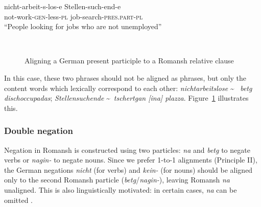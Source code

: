 \begin{exe}
   \ex\label{ex:stellensuchende} 
   \gll nicht-arbeit-s-los-e Stellen-such-end-e  \\
        not-work-\textsc{\acrshort{gen}}-less-\textsc{\acrshort{pl}} job-search-\textsc{\acrshort{pres}.\acrshort{part}}-\textsc{\acrshort{pl}} \\
        \trans \enquote{People looking for jobs who are not unemployed}
\end{exe}

\begin{figure}[ht]
\centering
{}  \

\vspace*{1cm}

          
\caption{Aligning a German present participle to a Romansh relative clause}
\label{fig:align-part1}
\end{figure}

In this case, these two phrases should not be aligned as phrases, but only the content words which lexically correspond to each other: \emph{nichtarbeitslose} \textasciitilde ~ \emph{betg dischoccupadas}; \emph{Stellensuchende} \textasciitilde ~\emph{tschertgan [ina] plazza}. Figure~\ref{fig:align-part1} illustrates this.

\subsubsection{Double negation}
Negation in Romansh is constructed using two particles: \emph{na} and \emph{betg} to negate verbs or \emph{nagin-} to negate nouns. 
Since we prefer 1-to-1 alignments (Principle II), the German negations \emph{nicht} (for verbs) and \emph{kein-} (for nouns) should be aligned only to the second Romansh particle (\emph{betg}/\emph{nagin-}), leaving Romansh \emph{na} unaligned. 
This is also linguistically motivated: in certain cases, \emph{na} can be omitted \autocite[section 285]{caduff-2008-rumantsch-grischun}. 

